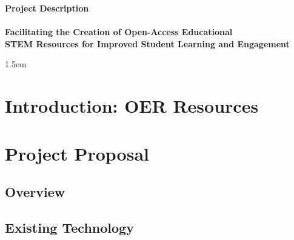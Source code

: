 \documentclass[11pt]{article}
\theoremstyle{theorem}
\theoremstyle{definition}
\begin{document}
\begin{center}
\textbf{\Large Project Description}\\[0.25cm]
\hrulefill\\[0.5cm]
\textbf{\Large Facilitating the Creation of Open-Access Educational \\[0.25cm] STEM Resources for Improved Student Learning and Engagement}\\
\hrulefill
\end{center}
\baselineskip 1.5em

\section{Introduction: OER Resources}


\section{Project Proposal}



\subsection{Overview}

\subsection{Existing Technology}
\end{document}
